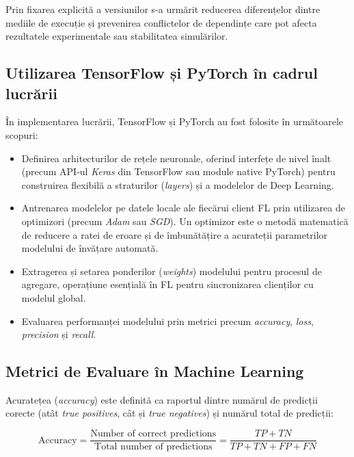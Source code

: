 \documentclass[../../main.tex]{subfiles}
\begin{document}
        Prin fixarea explicită a versiunilor s-a urmărit reducerea diferențelor dintre mediile de execuție și prevenirea conflictelor de dependințe care pot afecta rezultatele experimentale sau stabilitatea simulărilor.

	        \subsection{Utilizarea TensorFlow și PyTorch în cadrul lucrării}

	        În implementarea lucrării, TensorFlow și PyTorch au fost folosite în următoarele scopuri:

\begin{itemize}
    \item Definirea arhitecturilor de rețele neuronale, oferind interfețe de nivel înalt (precum API-ul \textit{Keras} din TensorFlow sau module native PyTorch) pentru construirea flexibilă a straturilor (\textit{layers}) și a modelelor de Deep Learning.
	    \item Antrenarea modelelor pe datele locale ale fiecărui client FL prin utilizarea de optimizori (precum \textit{Adam} sau \textit{SGD}). Un optimizor este o metodă matematică de reducere a ratei de eroare și de îmbunătățire a acurateții parametrilor modelului de învățare automată.
	    \item Extragerea și setarea ponderilor (\textit{weights}) modelului pentru procesul de agregare, operațiune esențială în FL pentru sincronizarea clienților cu modelul global.
	    \item Evaluarea performanței modelului prin metrici precum \textit{accuracy}, \textit{loss}, \textit{precision} și \textit{recall}.
\end{itemize}

        \subsection{Metrici de Evaluare în Machine Learning}

        Acuratețea (\textit{accuracy}) este definită ca raportul dintre numărul de predicții corecte (atât \textit{true positives}, cât și \textit{true negatives}) și numărul total de predicții:

\begin{equation}
\text{Accuracy} = \frac{\text{Number of correct predictions}}{\text{Total number of predictions}}
= \frac{TP + TN}{TP + TN + FP + FN}
\end{equation}
\end{document}
